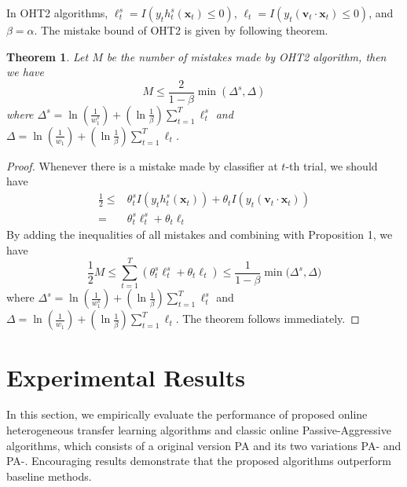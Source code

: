 \documentclass{article} %
\newtheorem{thm}{Theorem}
\theoremstyle{remark}
\theoremstyle{definition}
\begin{document}
In OHT2 algorithms, $\ell_{t}^{s} = I(y_t h_{t}^{s}(\mathbf{x}_t) \leq 0)$, $\ell_t = I(y_t (\mathbf{v}_t \cdot \mathbf{x}_t) \leq 0)$, and $\beta = \alpha$.
The mistake bound of OHT2 is given by following theorem.

\begin{thm}
Let $M$ be the number of mistakes made by OHT2 algorithm, then we have 
$$ M \leq \frac{2}{1-\beta} \min (\varDelta^s, \varDelta) $$
where
$ \varDelta^s = \ln(\frac{1}{w_{1}^{s}}) + (\ln \frac{1}{\beta}) \sum\limits_{t=1}^{T} \ell_{t}^{s} $ and $ \varDelta = \ln(\frac{1}{w_{1}}) + (\ln \frac{1}{\beta}) \sum\limits_{t=1}^{T} \ell_{t} $.
\end{thm}

\begin{proof}
Whenever there is a mistake made by classifier at $t$-th trial, we should have
\begin{equation*}
\begin{split}
\frac{1}{2} \leq
  & \theta_{t}^{s} I(y_t h_{t}^{s}(\mathbf{x}_t)) + \theta_t I(y_t (\mathbf{v}_t \cdot \mathbf{x}_t)) \\
= & \theta_{t}^{s} \ell_{t}^{s} + \theta_t \ell_t
\end{split}
\end{equation*}
By adding the inequalities of all mistakes and combining with Proposition 1, we have
$$ \frac{1}{2}M \leq \sum\limits_{t=1}^{T} ( \theta_{t}^{s} \ell_{t}^{s} + \theta_t \ell_t ) \leq \frac{1}{1-\beta} \min \big( \varDelta^s, \varDelta \big) $$
where
$ \varDelta^s = \ln(\frac{1}{w_{1}^{s}}) + (\ln \frac{1}{\beta}) \sum\limits_{t=1}^{T} \ell_{t}^{s} $ and $ \varDelta = \ln(\frac{1}{w_{1}}) + (\ln \frac{1}{\beta}) \sum\limits_{t=1}^{T} \ell_{t} $.
The theorem follows immediately.
\end{proof}


\section{Experimental Results}

In this section, we empirically evaluate the performance of proposed online heterogeneous transfer learning algorithms and classic online Passive-Aggressive algorithms, which consists of a original version PA and its two variations PA-\uppercase\expandafter{} and PA-\uppercase\expandafter{}.
Encouraging results demonstrate that the proposed algorithms outperform baseline methods.
\end{document}
